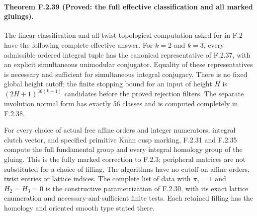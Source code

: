 \paragraph{Theorem F.2.39 (Proved: the full effective classification and all marked gluings).}
The linear classification and all-twist topological computation
asked for in F.2 have the following complete effective answer.
For $k=2$ and $k=3$, every admissible ordered integral tuple
has the canonical representative of F.2.37, with an explicit
simultaneous unimodular conjugator.  Equality of these
representatives is necessary and sufficient for simultaneous
integral conjugacy.  There is no fixed global height cutoff;
the finite stopping bound for an input of height $H$ is
$(2H+1)^{36(k+1)}$ candidates before the proved rejection
filters.  The separate involution normal form has exactly
56 classes and is computed completely in F.2.38.

For every choice of actual free affine orders and integer
numerators, integral clutch vector, and specified primitive
Kuhn cusp marking, F.2.31 and F.2.35 compute the full
fundamental group and every integral homology group of the
gluing.  This is the fully marked correction to F.2.3;
peripheral matrices are not substituted for a choice of
filling.  The algorithms have no cutoff on affine orders,
twist entries or lattice indices.  The complete list of data
with $\pi_1=1$ and $H_2=H_3=0$ is the constructive
parametrization of F.2.30, with its exact lattice enumeration
and necessary-and-sufficient finite tests.  Each retained
filling has the homology and oriented smooth type stated
there.

